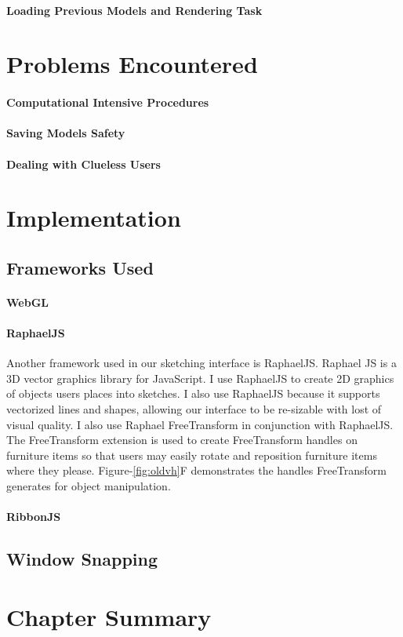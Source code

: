 		\paragraph{Loading Previous Models and Rendering Task}

	\section{Problems Encountered}
		\paragraph{Computational Intensive Procedures}
		\paragraph{Saving Models Safety}
		\paragraph{Dealing with Clueless Users}

	\section{Implementation}

		\subsection{Frameworks Used}
			\paragraph{WebGL}
			\paragraph{RaphaelJS}
				Another framework used in our sketching interface is RaphaelJS\cite{todo}.
				Raphael JS is a 3D vector graphics library for JavaScript. 
				I use RaphaelJS to create 2D graphics of objects users places into sketches. I also use RaphaelJS because it supports vectorized lines and shapes, allowing our interface  to be re-sizable with lost of visual quality.
				I also use Raphael FreeTransform in conjunction with RaphaelJS\cite{todo}. 
				The FreeTransform extension is used to create FreeTransform handles on furniture items so that users may easily rotate and reposition furniture items where they please.
				Figure-\ref{fig:oldvh}F demonstrates the handles FreeTransform generates for object manipulation.\\


			\paragraph{RibbonJS}


		\subsection{Window Snapping}

	\section{Chapter Summary}

